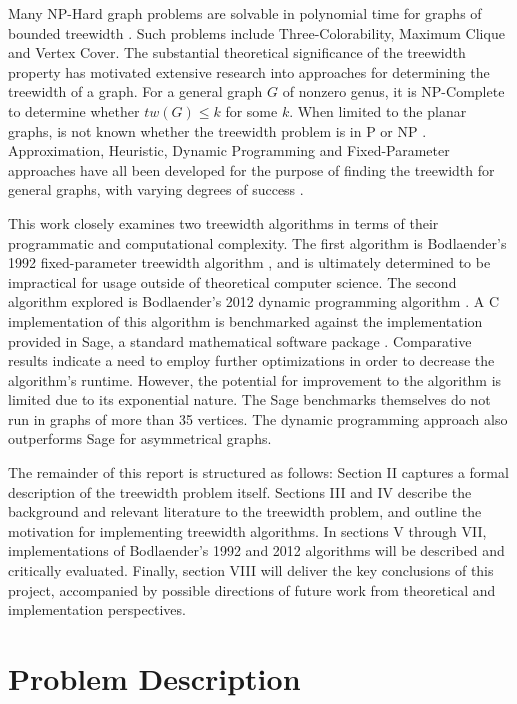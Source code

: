 \documentclass[12pt,conference]{IEEEtran}
\theoremstyle{plain}
\begin{document}
Many NP-Hard graph problems are solvable in polynomial time for graphs of bounded treewidth \cite{bodlaender-treewidth-power}. Such problems include Three-Colorability, Maximum Clique and Vertex Cover. The substantial theoretical significance of the treewidth property has motivated extensive research into approaches for determining the treewidth of a graph. For a general graph $G$ of nonzero genus, it is NP-Complete to determine whether $tw(G) \leq k$ for some $k$. When limited to the planar graphs, is not known whether the treewidth problem is in P or NP \cite{planar-treewidth-unsolved}. Approximation, Heuristic, Dynamic Programming and Fixed-Parameter approaches have all been developed for the purpose of finding the treewidth for general graphs, with varying degrees of success \cite{treewidth-survey}. 

This work closely examines two treewidth algorithms in terms of their programmatic and computational complexity. The first algorithm is Bodlaender's 1992 fixed-parameter treewidth algorithm \cite{bodlaender-1992}, and is ultimately determined to be impractical for usage outside of theoretical computer science. The second algorithm explored is Bodlaender's 2012 dynamic programming algorithm \cite{bodlaender-2012}. A C implementation of this algorithm is benchmarked against the implementation provided in Sage, a standard mathematical software package \cite{sage-original}. Comparative results indicate a need to employ further optimizations in order to decrease the algorithm's runtime. However, the potential for improvement to the algorithm is limited due to its exponential nature. The Sage benchmarks themselves do not run in graphs of more than 35 vertices. The dynamic programming approach also outperforms Sage for asymmetrical graphs.

The remainder of this report is structured as follows: Section II captures a formal description of the treewidth problem itself. Sections III and IV describe the background and relevant literature to the treewidth problem, and outline the motivation for implementing treewidth algorithms. In sections V through VII, implementations of Bodlaender's 1992 and 2012 algorithms will be described and critically evaluated. Finally, section VIII will deliver the key conclusions of this project, accompanied by possible directions of future work from theoretical and implementation perspectives.

\section{Problem Description}
\end{document}
